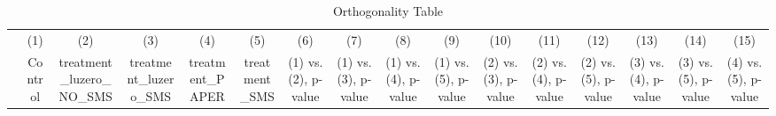 \documentclass[12pt]{article}
\begin{document}
\begin{table}
\centering\caption {Orthogonality Table}
\def\sym#1{\ifmmode^{#1}\else\(^{#1}\)\fi}
\begin{tabular}{p{2.5cm}*{15}{c}}
\hline\hline
&\multicolumn{1}{c}{(1)}&\multicolumn{1}{c}{(2)}&\multicolumn{1}{c}{(3)}&\multicolumn{1}{c}{(4)}&\multicolumn{1}{c}{(5)}&\multicolumn{1}{c}{(6)}&\multicolumn{1}{c}{(7)}&\multicolumn{1}{c}{(8)}&\multicolumn{1}{c}{(9)}&\multicolumn{1}{c}{(10)}&\multicolumn{1}{c}{(11)}&\multicolumn{1}{c}{(12)}&\multicolumn{1}{c}{(13)}&\multicolumn{1}{c}{(14)}&\multicolumn{1}{c}{(15)}\\
&\multicolumn{1}{c}{Control}&\multicolumn{1}{p{2.75cm}}{\centering treatment_luzero_NO_SMS}&\multicolumn{1}{p{2.75cm}}{\centering treatment_luzero_SMS}&\multicolumn{1}{p{2.75cm}}{\centering treatment_PAPER}&\multicolumn{1}{p{2.75cm}}{\centering treatment_SMS}&\multicolumn{1}{p{2.75cm}}{\centering (1) vs. (2), p-value}&\multicolumn{1}{p{2.75cm}}{\centering (1) vs. (3), p-value}&\multicolumn{1}{p{2.75cm}}{\centering (1) vs. (4), p-value}&\multicolumn{1}{p{2.75cm}}{\centering (1) vs. (5), p-value}&\multicolumn{1}{p{2.75cm}}{\centering (2) vs. (3), p-value}&\multicolumn{1}{p{2.75cm}}{\centering (2) vs. (4), p-value}&\multicolumn{1}{p{2.75cm}}{\centering (2) vs. (5), p-value}&\multicolumn{1}{p{2.75cm}}{\centering (3) vs. (4), p-value}&\multicolumn{1}{p{2.75cm}}{\centering (3) vs. (5), p-value}&\multicolumn{1}{p{2.75cm}}{\centering (4) vs. (5), p-value}\\
\hline

\end{tabular}
\end{table}
\end{document}
